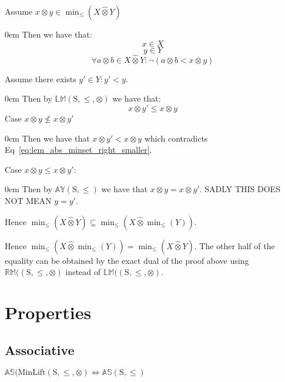 \documentclass[10pt]{article}
\newcommand{\propname}[1]{{\mathbb{#1}}}
\newcommand{\lift}{\hat{\otimes}}
\newenvironment{ind}[0]{\begin{addmargin}[1em]{0em}\vspace{0.5em}}{\end{addmargin}\vspace{0.5em}}
\begin{document}
\vspace{2em}

Assume $x \otimes y \in \min_\leq(X \lift Y)$
\begin{ind}
Then we have that:
\begin{equation}
x \in X
\end{equation}
\begin{equation}
y \in Y
\end{equation}
\begin{equation} \label{eq:lem_abs_minset_right_smaller}
\forall a \otimes b \in X \lift Y : \neg (a \otimes b < x \otimes y)
\end{equation}

Assume there exists $y' \in Y : y' < y$.
\begin{ind}
Then by $\propname{LM}\mathrm{(S,\leq,\otimes)}$ we have that:
\begin{equation}
x \otimes y' \leq x \otimes y
\end{equation}
Case $x \otimes y \nleq x \otimes y'$
\begin{ind}
Then we have that $x \otimes y' < x \otimes y$ which contradicts Eq~\ref{eq:lem_abs_minset_right_smaller}.
\end{ind}
Case $x \otimes y \leq x \otimes y'$:
\begin{ind}
Then by $\propname{AY}\mathrm{(S,\leq)}$ we have that $x \otimes y = x \otimes y'$. SADLY THIS DOES NOT MEAN $y = y'$.
\end{ind}
\end{ind}
\end{ind}
Hence $\min_\leq(X \lift Y) \subseteq \min_\leq(X \lift \min_\leq(Y))$.

\vspace{2em}

Hence $\min_\leq(X \lift \min_\leq(Y)) = \min_\leq(X \lift Y)$. The other half of the equality can be obtained by the exact dual of the proof above using $\propname{RM}(\mathrm{(S,\leq,\otimes)}$ instead of $\propname{LM}(\mathrm{(S,\leq,\otimes)}$.

\section{Properties}

\subsection{Associative}

$\propname{AS}(\mathrm{MinLift(S,\leq,\otimes)} \Leftrightarrow \propname{AS}(\mathrm{S,\leq})$
\end{document}
